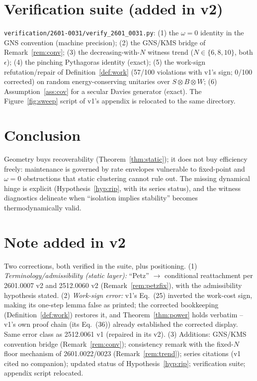 \documentclass[11pt]{article}
\theoremstyle{remark}
\begin{document}
\section{Verification suite (added in v2)}
\label{sec:verif}
\texttt{verification/2601-0031/verify\_2601\_0031.py}: (1) the
$\omega = 0$ identity in the GNS convention (machine precision); (2) the
GNS/KMS bridge of Remark~\ref{rem:conv}; (3) the decreasing-with-$N$
witness trend ($N \in \{6,8,10\}$, both $\epsilon$); (4) the pinching
Pythagoras identity (exact); (5) the work-sign refutation/repair of
Definition~\ref{def:work} (57/100 violations with v1's sign; 0/100
corrected) on random energy-conserving unitaries over
$S \otimes B \otimes W$; (6) Assumption~\ref{ass:cov} for a secular Davies
generator (exact). The Figure~\ref{fig:sweep} script of v1's appendix is
relocated to the same directory.

\section{Conclusion}
Geometry buys recoverability (Theorem~\ref{thm:static}); it does not buy
efficiency freely: maintenance is governed by rate envelopes vulnerable to
fixed-point and $\omega = 0$ obstructions that static clustering cannot
rule out. The missing dynamical hinge is explicit
(Hypothesis~\ref{hyp:rip}, with its series status), and the witness
diagnostics delineate when ``isolation implies stability'' becomes
thermodynamically valid.

\section*{Note added in v2}
Two corrections, both verified in the suite, plus positioning. (1)
\emph{Terminology/admissibility (static layer):} ``Petz'' $\to$
conditional reattachment per 2601.0007 v2 and 2512.0060 v2
(Remark~\ref{rem:petzfix}), with the admissibility hypothesis stated. (2)
\emph{Work-sign error:} v1's Eq.~(25) inverted the work-cost sign, making
its one-step lemma false as printed; the corrected bookkeeping
(Definition~\ref{def:work}) restores it, and Theorem~\ref{thm:power} holds
verbatim -- v1's own proof chain (its Eq.~(36)) already established the
corrected display. Same error class as 2512.0061 v1 (repaired in its v2).
(3) Additions: GNS/KMS convention bridge (Remark~\ref{rem:conv});
consistency remark with the fixed-$N$ floor mechanism of 2601.0022/0023
(Remark~\ref{rem:trend}); series citations (v1 cited no companion);
updated status of Hypothesis~\ref{hyp:rip}; verification suite; appendix
script relocated.
\end{document}
